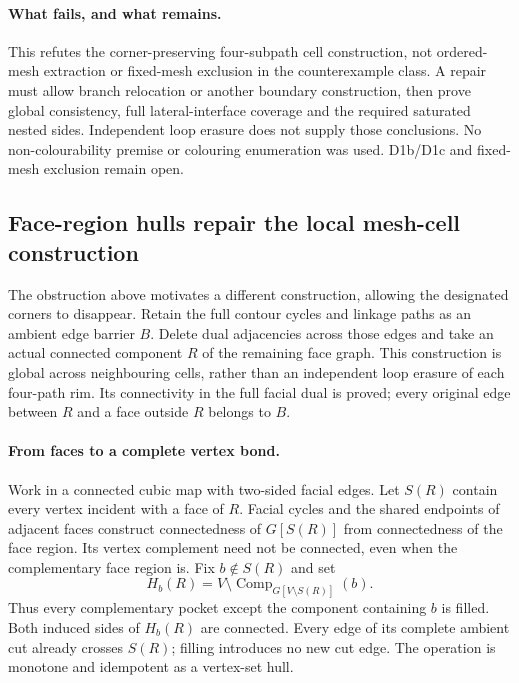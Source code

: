 \paragraph{What fails, and what remains.}
This refutes the corner-preserving four-subpath cell construction, not
ordered-mesh extraction or fixed-mesh exclusion in the counterexample
class. A repair must allow branch relocation or another boundary
construction, then prove global consistency, full lateral-interface
coverage and the required saturated nested sides. Independent loop
erasure does not supply those conclusions. No non-colourability premise
or colouring enumeration was used. D1b/D1c and fixed-mesh exclusion remain
open.

\subsection{Face-region hulls repair the local mesh-cell construction}
\label{sec:face-region-hulls}

The obstruction above motivates a different construction, allowing the
designated corners to disappear. Retain the full contour cycles and
linkage paths as an ambient edge barrier $B$. Delete dual adjacencies
across those edges and take an actual connected component $R$ of the
remaining face graph. This construction is global across neighbouring
cells, rather than an independent loop erasure of each four-path rim.
Its connectivity in the full facial dual is proved; every original edge
between $R$ and a face outside $R$ belongs to $B$.

\paragraph{From faces to a complete vertex bond.}
Work in a connected cubic map with two-sided facial edges. Let $S(R)$
contain every vertex incident with a face of $R$. Facial cycles
and the shared endpoints of adjacent faces construct connectedness of
$G[S(R)]$ from connectedness of the face region. Its vertex complement
need not be connected, even when the complementary face region is.
Fix $b\notin S(R)$ and set
\[
 H_b(R)=V\setminus\operatorname{Comp}_{G[V\setminus S(R)]}(b).
\]
Thus every complementary pocket except the component containing $b$ is
filled. Both induced sides of $H_b(R)$ are connected. Every edge of its
complete ambient cut already crosses $S(R)$; filling introduces no new
cut edge. The operation is monotone and idempotent as a vertex-set hull.

